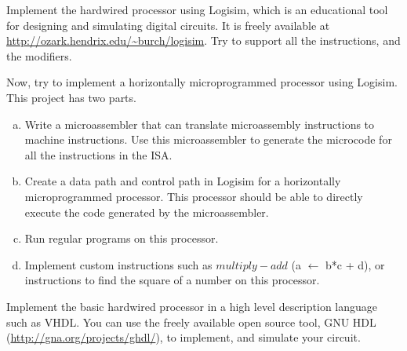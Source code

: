 \begin{ExerciseList}
\Exercise
Implement the hardwired \simplerisc processor using Logisim, which is an educational tool for designing
and simulating digital circuits. It is freely available at \url{http://ozark.hendrix.edu/~burch/logisim}. 
Try to support all the instructions, and the modifiers.

\Exercise Now, try to implement a horizontally microprogrammed processor using Logisim. This project has
two parts.
\begin{enumerate}[a)]
\item Write a microassembler that can translate microassembly instructions to machine instructions. Use
this microassembler to generate the microcode for all the instructions in the \simplerisc ISA.
\item Create a data path and control path in Logisim for a horizontally microprogrammed processor.
This processor should be able to directly execute the code generated by the microassembler.
\item Run regular \simplerisc programs on this processor. 
\item Implement custom \simplerisc instructions such as $multiply-add$ (a $\leftarrow$ b*c + d), or instructions
to find the square of a number on this processor.
\end{enumerate}

\Exercise 
Implement the basic hardwired processor in a high level description language such as VHDL. You can use the
freely available open source tool, GNU HDL (\url{http://gna.org/projects/ghdl/}), to implement, and simulate
your circuit.

\end{ExerciseList}





































